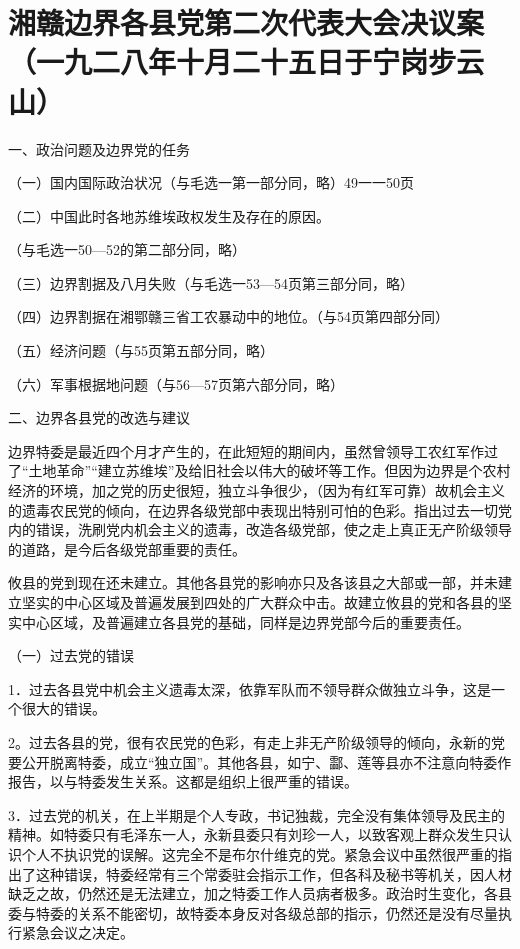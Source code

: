 \section[湘赣边界各县党第二次代表大会决议案（一九二八年十月二十五日于宁岗步云山）]{湘赣边界各县党第二次代表大会决议案（一九二八年十月二十五日于宁岗步云山）}


一、政治问题及边界党的任务

（一）国内国际政治状况（与毛选一第一部分同，略）49一一50页

（二）中国此时各地苏维埃政权发生及存在的原因。

（与毛选一50—52的第二部分同，略）

（三）边界割据及八月失败（与毛选一53—54页第三部分同，略）

（四）边界割据在湘鄂赣三省工农暴动中的地位。（与54页第四部分同）

（五）经济问题（与55页第五部分同，略）

（六）军事根据地问题（与56—57页第六部分同，略）

二、边界各县党的改选与建议

边界特委是最近四个月才产生的，在此短短的期间内，虽然曾领导工农红军作过了“土地革命”“建立苏维埃”及给旧社会以伟大的破坏等工作。但因为边界是个农村经济的环境，加之党的历史很短，独立斗争很少，（因为有红军可靠）故机会主义的遗毒农民党的倾向，在边界各级党部中表现出特别可怕的色彩。指出过去一切党内的错误，洗刷党内机会主义的遗毒，改造各级党部，使之走上真正无产阶级领导的道路，是今后各级党部重要的责任。

攸县的党到现在还未建立。其他各县党的影响亦只及各该县之大部或一部，并未建立坚实的中心区域及普遍发展到四处的广大群众中击。故建立攸县的党和各县的坚实中心区域，及普遍建立各县党的基础，同样是边界党部今后的重要责任。

（一）过去党的错误

1．过去各县党中机会主义遗毒太深，依靠军队而不领导群众做独立斗争，这是一个很大的错误。

2。过去各县的党，很有农民党的色彩，有走上非无产阶级领导的倾向，永新的党要公开脱离特委，成立“独立国”。其他各县，如宁、酃、莲等县亦不注意向特委作报告，以与特委发生关系。这都是组织上很严重的错误。

3．过去党的机关，在上半期是个人专政，书记独裁，完全没有集体领导及民主的精神。如特委只有毛泽东一人，永新县委只有刘珍一人，以致客观上群众发生只认识个人不执识党的误解。这完全不是布尔什维克的党。紧急会议中虽然很严重的指出了这种错误，特委经常有三个常委驻会指示工作，但各科及秘书等机关，因人材缺乏之故，仍然还是无法建立，加之特委工作人员病者极多。政治时生变化，各县委与特委的关系不能密切，故特委本身反对各级总部的指示，仍然还是没有尽量执行紧急会议之决定。

